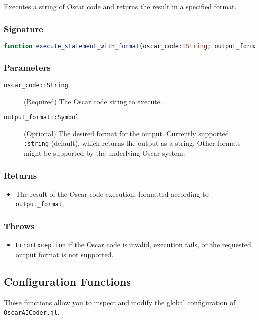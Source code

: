 \documentclass[11pt,a4paper]{article}
\newcommand{\code}[1]{\texttt{#1}}
\newcommand{\modname}[1]{\texttt{#1}}
\providecommand{\code}[1]{\texttt{\color{blue!70!black}#1}}
\begin{document}
Executes a string of Oscar code and returns the result in a specified format.

\subsubsection*{Signature}
\begin{lstlisting}[language=Julia]
function execute_statement_with_format(oscar_code::String; output_format=:string)
\end{lstlisting}

\subsubsection*{Parameters}
\begin{description}
    \item[\code{oscar\_code::String}] (Required) The Oscar code string to execute.
    \item[\code{output\_format::Symbol}] (Optional) The desired format for the output. Currently supported: \code{:string} (default), which returns the output as a string. Other formats might be supported by the underlying Oscar system.
\end{description}

\subsubsection*{Returns}
\begin{itemize}
    \item The result of the Oscar code execution, formatted according to \code{output\_format}.
\end{itemize}

\subsubsection*{Throws}
\begin{itemize}
    \item \code{ErrorException} if the Oscar code is invalid, execution fails, or the requested output format is not supported.
\end{itemize}


\subsection{Configuration Functions}
\label{sec:config_functions}

These functions allow you to inspect and modify the global configuration of \modname{OscarAICoder.jl}.
\end{document}
